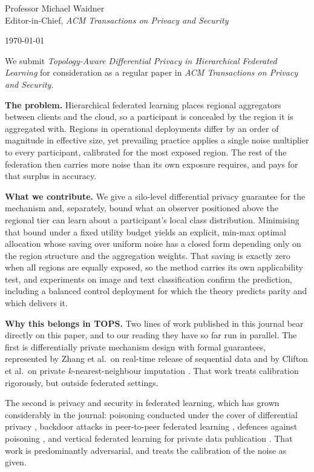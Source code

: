 \documentclass[11pt,a4paper]{article}
\newcommand{\lhead}[1]{\medskip\noindent\textbf{#1}\quad\ignorespaces}
\begin{document}
\noindent
Professor Michael Waidner\\
Editor-in-Chief, \emph{ACM Transactions on Privacy and Security}

\medskip
\noindent\today

\medskip

We submit \emph{Topology-Aware Differential Privacy in Hierarchical Federated Learning} for
consideration as a regular paper in \emph{ACM Transactions on Privacy and Security}.

\lhead{The problem.}
Hierarchical federated learning places regional aggregators between clients and the cloud, so
a participant is concealed by the region it is aggregated with. Regions in operational
deployments differ by an order of magnitude in effective size, yet prevailing practice applies
a single noise multiplier to every participant, calibrated for the most exposed region. The
rest of the federation then carries more noise than its own exposure requires, and pays for
that surplus in accuracy.

\lhead{What we contribute.}
We give a silo-level differential privacy guarantee for the mechanism and, separately, bound
what an observer positioned above the regional tier can learn about a participant's local
class distribution. Minimising that bound under a fixed utility budget yields an explicit,
min-max optimal allocation whose saving over uniform noise has a closed form depending only on
the region structure and the aggregation weights. That saving is exactly zero when all regions
are equally exposed, so the method carries its own applicability test, and experiments on
image and text classification confirm the prediction, including a balanced control deployment
for which the theory predicts parity and which delivers it.

\lhead{Why this belongs in TOPS.}
Two lines of work published in this journal bear directly on this paper, and to our reading they have so
far run in parallel. The first is differentially private mechanism design with formal guarantees, represented by
Zhang et al.\ on real-time release of sequential data \cite{zhang2023sequential} and by
Clifton et al.\ on private $k$-nearest-neighbour imputation \cite{clifton2022knn}. That work
treats calibration rigorously, but outside federated settings.

The second is privacy and security in federated learning, which has grown considerably in the
journal: poisoning conducted under the cover of differential privacy
\cite{zheng2025dppoison}, backdoor attacks in peer-to-peer federated learning
\cite{syros2025backdoor}, defences against poisoning \cite{zheng2025gradcam}, and vertical
federated learning for private data publication \cite{xun2026vflgan}. That work is
predominantly adversarial, and treats the calibration of the noise as given.
\end{document}
